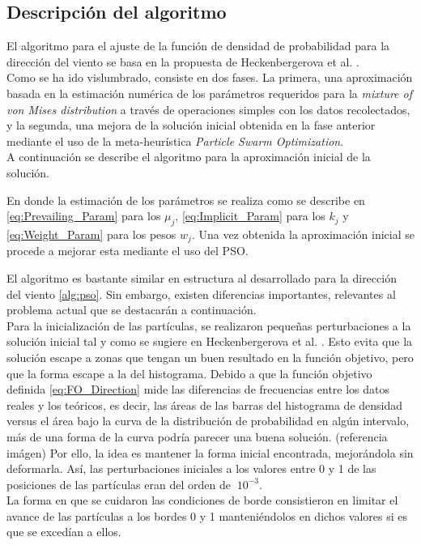 \subsection{Descripción del algoritmo}
El algoritmo para el ajuste de la función de densidad de probabilidad para la dirección del viento se basa en la propuesta de Heckenbergerova et al. \cite{Heckenbergerova15}.\\ 
Como se ha ido vislumbrado, consiste en dos fases. La primera, una aproximación basada en la estimación numérica de los parámetros requeridos para la \emph{mixture of von Mises distribution} a través de operaciones simples con los datos recolectados, y la segunda, una mejora de la solución inicial obtenida en la fase anterior mediante el uso de la meta-heurística \emph{Particle Swarm Optimization}. \\
A continuación se describe el algoritmo para la aproximación inicial de la solución.

En donde la estimación de los parámetros se realiza como se describe en \ref{eq:Prevailing_Param} para los $\mu_j$, \ref{eq:Implicit_Param} para los $k_j$ y \ref{eq:Weight_Param} para los pesos $w_j$.
Una vez obtenida la aproximación inicial se procede a mejorar esta mediante el uso del PSO.

El algoritmo es bastante similar en estructura al desarrollado para la dirección del viento \ref{alg:pso}. Sin embargo,
existen diferencias importantes, relevantes al problema actual que se destacarán a continuación.\\
Para la inicialización de las partículas, se realizaron pequeñas perturbaciones a la solución inicial tal y como se sugiere en Heckenbergerova et al. \cite{Heckenbergerova15}. Esto evita que la solución escape a zonas que tengan un buen resultado en la función objetivo, pero que la forma escape a la del histograma. Debido a que la función objetivo definida \ref{eq:FO_Direction} mide las diferencias de frecuencias entre los datos reales y los teóricos, es decir, las áreas de las barras del histograma de densidad versus el área bajo la curva de la distribución de probabilidad en algún intervalo, más de una forma de la curva podría parecer una buena solución. (referencia imágen) Por ello, la idea es mantener la forma inicial encontrada, mejorándola sin deformarla. Así, las perturbaciones iniciales a los valores entre 0 y 1  de las posiciones de las partículas eran del orden de $~ 10^{-3}$.\\
La forma en que se cuidaron las condiciones de borde consistieron en limitar el avance de las partículas a los bordes 0 y 1 manteniéndolos en dichos valores si es que se excedían a ellos.\\
